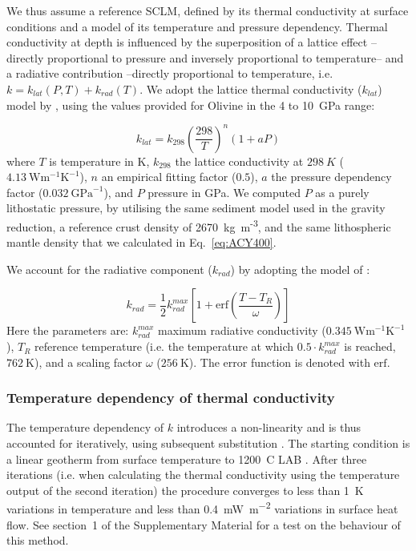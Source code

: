 We thus assume a reference SCLM, defined by its thermal conductivity at surface conditions and a model of its temperature and pressure dependency.
Thermal conductivity at depth is influenced by the superposition of a lattice effect --directly proportional to pressure and inversely proportional to temperature-- and a radiative contribution --directly proportional to temperature, i.e. $k = k_{lat}(P,T) + k_{rad}(T)$.
We adopt the lattice thermal conductivity ($k_{lat}$) model by \textcite{Xu2004}, using the values provided for Olivine in the 4 to 10~GPa range:

\begin{equation}
	\label{kLat}
	k_{lat} = k_{298} \left( \frac{298}{T} \right)^n (1+ a P)
\end{equation}
where $T$ is temperature in K, $k_{298}$ the lattice conductivity at $298~K$ ($4.13~\textrm{W} \textrm{m}^{-1} \textrm{K}^{-1}$), $n$ an empirical fitting factor ($0.5$), $a$ the pressure dependency factor ($0.032~\textrm{GPa}^{-1}$), and $P$ pressure in GPa.
We computed $P$ as a purely lithostatic pressure, by utilising the same sediment model used in the gravity reduction, a reference crust density of 2670~{kg~m\textsuperscript{-3}}, and the same lithospheric mantle density that we calculated in Eq.~\ref{eq:ACY400}.

We account for the radiative component ($k_{rad}$) by adopting the model of \textcite{Hasterok2011cont}:

\begin{equation}
	\label{kRad}
	k_{rad} = \frac{1}{2} k_{rad}^{max}  \left[ 1 + \mathrm{erf} \left( \frac{T-T_R}{\omega} \right) \right]
\end{equation}
Here the parameters are: $k_{rad}^{max}$ maximum radiative conductivity ($0.345~\textrm{W} \textrm{m}^{-1} \textrm{K}^{-1}$), $T_R$ reference temperature (i.e. the temperature at which $0.5 \cdot k_{rad}^{max}$ is reached, $762~\textrm{K}$), and a scaling factor $\omega$ ($256~\textrm{K}$).
The error function is denoted with $\mathrm{erf}$.

\subsubsection{Temperature dependency of thermal conductivity}
\label{sss:ThermCondTdep}
The temperature dependency of $k$ introduces a non-linearity and is thus accounted for iteratively, using subsequent substitution \parencite[or `Picard's method', e.g. ][]{Hauck1999}.
The starting condition is a linear geotherm from surface temperature to 1200~\textdegree C LAB \parencite{fischer2010lab}.
After three iterations (i.e. when calculating the thermal conductivity using the temperature output of the second iteration) the procedure converges to less than 1~K variations in temperature and less than {0.4}~\si{\milli \watt \per \square \metre} variations in surface heat flow.
See section~1 of the Supplementary Material for a test on the behaviour of this method.

